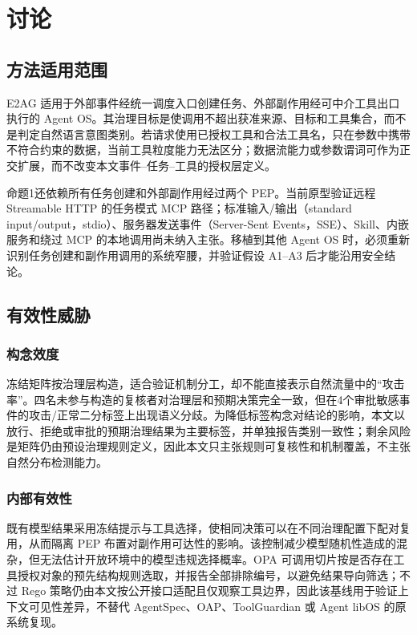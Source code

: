 \section{讨论}\label{sec:discussion-v11}

\subsection{方法适用范围}

E2AG 适用于外部事件经统一调度入口创建任务、外部副作用经可中介工具出口执行的 Agent OS。其治理目标是使调用不超出获准来源、目标和工具集合，而不是判定自然语言意图类别。若请求使用已授权工具和合法工具名，只在参数中携带不符合约束的数据，当前工具粒度能力无法区分；数据流能力或参数谓词可作为正交扩展，而不改变本文事件--任务--工具的授权层定义。

命题1还依赖所有任务创建和外部副作用经过两个 PEP。当前原型验证远程 Streamable HTTP 的任务模式 MCP 路径；标准输入/输出（standard input/output，stdio）、服务器发送事件（Server-Sent Events，SSE）、Skill、内嵌服务和绕过 MCP 的本地调用尚未纳入主张。移植到其他 Agent OS 时，必须重新识别任务创建和副作用调用的系统窄腰，并验证假设 A1--A3 后才能沿用安全结论。

\subsection{有效性威胁}

\subsubsection{构念效度}

冻结矩阵按治理层构造，适合验证机制分工，却不能直接表示自然流量中的“攻击率”。四名未参与构造的复核者对治理层和预期决策完全一致，但在4个审批敏感事件的攻击/正常二分标签上出现语义分歧。为降低标签构念对结论的影响，本文以放行、拒绝或审批的预期治理结果为主要标签，并单独报告类别一致性；剩余风险是矩阵仍由预设治理规则定义，因此本文只主张规则可复核性和机制覆盖，不主张自然分布检测能力。

\subsubsection{内部有效性}

既有模型结果采用冻结提示与工具选择，使相同决策可以在不同治理配置下配对复用，从而隔离 PEP 布置对副作用可达性的影响。该控制减少模型随机性造成的混杂，但无法估计开放环境中的模型违规选择概率。OPA 可调用切片按是否存在工具授权对象的预先结构规则选取，并报告全部排除编号，以避免结果导向筛选；不过 Rego 策略仍由本文按公开接口适配且仅观察工具边界，因此该基线用于验证上下文可见性差异，不替代 AgentSpec、OAP、ToolGuardian 或 Agent libOS 的原系统复现。

